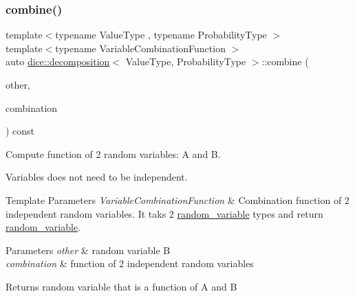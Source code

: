 \subsubsection{\texorpdfstring{combine()}{combine()}}
{\footnotesize\ttfamily template$<$typename Value\+Type , typename Probability\+Type $>$ \\
template$<$typename Variable\+Combination\+Function $>$ \\
auto \mbox{\hyperlink{classdice_1_1decomposition}{dice\+::decomposition}}$<$ Value\+Type, Probability\+Type $>$\+::combine (\begin{DoxyParamCaption}\item[{const \mbox{\hyperlink{classdice_1_1decomposition}{decomposition}}$<$ Value\+Type, Probability\+Type $>$ \&}]{other,  }\item[{Variable\+Combination\+Function}]{combination }\end{DoxyParamCaption}) const\hspace{0.3cm}{\ttfamily [inline]}}



Compute function of 2 random variables\+: A and B. 

Variables does not need to be independent.


\begin{DoxyTemplParams}{Template Parameters}
{\em Variable\+Combination\+Function} & Combination function of 2 independent random variables. It taks 2 \mbox{\hyperlink{classdice_1_1random__variable}{random\+\_\+variable}} types and return \mbox{\hyperlink{classdice_1_1random__variable}{random\+\_\+variable}}.\\
\hline
\end{DoxyTemplParams}

\begin{DoxyParams}{Parameters}
{\em other} & random variable B \\
\hline
{\em combination} & function of 2 independent random variables\\
\hline
\end{DoxyParams}
\begin{DoxyReturn}{Returns}
random variable that is a function of A and B 
\end{DoxyReturn}
\mbox{\label{classdice_1_1decomposition_a0daca40a4952466df7e5ebe10f6a37b4}} 

